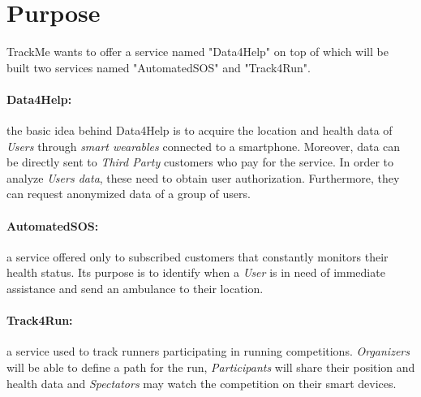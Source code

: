 \documentclass[../../rasd.tex]{subfiles}
\begin{document}
\section{Purpose}
			
			TrackMe wants to offer a service named "Data4Help" on top of which will be built two services named "AutomatedSOS" and "Track4Run".
			\paragraph{Data4Help:} the basic idea behind Data4Help is to acquire the location and health data of \textit{Users} through \textit{smart wearables} connected to a smartphone. Moreover, data can be directly sent to \textit{Third Party} customers who pay for the service. In order to analyze \textit{Users data}, these need to obtain user authorization. Furthermore, they can request anonymized data of a group of users.
			
			\paragraph{AutomatedSOS:} a service offered only to subscribed customers that constantly monitors their health status. Its purpose is to identify when a \textit{User} is in need of immediate assistance and send an ambulance to their location.
			
			\paragraph{Track4Run:} a service used to track runners participating in running competitions. \textit{Organizers} will be able to define a path for the run, \textit{Participants} will share their position and health data  and \textit{Spectators} may watch the competition on their smart devices.
\end{document}
